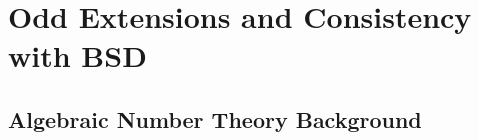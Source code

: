 \documentclass{article}
\theoremstyle{plain}
\theoremstyle{definition}
\begin{document}
\newpage
\section{Odd Extensions and Consistency with BSD}\label{sec_odd}


%

\newpage
\begin{appendices}
\section{Algebraic Number Theory Background}
%

\end{appendices}

\newpage



\end{document}
